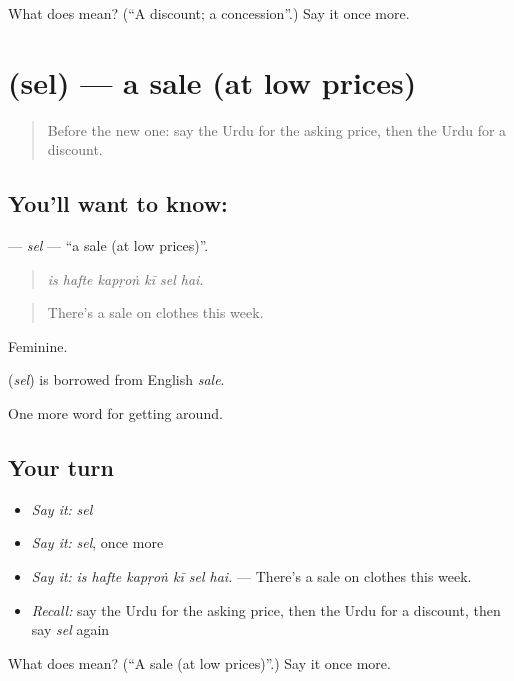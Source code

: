 \begin{tcolorbox}[breakable,colback=teal!4,colframe=teal!35!black,title={Before you move on}]
What does  mean? (\textquotedblleft{}A discount; a concession\textquotedblright{}.) Say it once more.
\end{tcolorbox}
\section[\texorpdfstring{\ur{سیل} (sel)}{سیل (sel)}]{ (sel) — a sale (at low prices)}

\label{lesson:UR-C423-sel}



\begin{quote}
Before the new one: say the Urdu for the asking price, then the Urdu for a discount.
\end{quote}

\subsection*{You'll want to know: }
\textbf{} — \emph{sel} — \textquotedblleft{}a sale (at low prices)\textquotedblright{}.

\begin{quote}
     
\end{quote}

\begin{quote}
\emph{is hafte kapṛoṅ kī sel hai.}
\end{quote}

\begin{quote}
There's a sale on clothes this week.
\end{quote}

Feminine.

\begin{cousinweb}
\textbf{} (\emph{sel}) is borrowed from English \emph{sale}.
\end{cousinweb}

\begin{grammarlens}[title={What you've built}]
One more word for getting around.
\end{grammarlens}

\subsection*{Your turn}
\begin{itemize}
\raggedright
  \item \emph{Say it:} \emph{sel}
  \item \emph{Say it:} \emph{sel}, once more
  \item \emph{Say it:} \emph{is hafte kapṛoṅ kī sel hai.} — There's a sale on clothes this week.
  \item \emph{Recall:} say the Urdu for the asking price, then the Urdu for a discount, then say \emph{sel} again
\end{itemize}

\begin{tcolorbox}[breakable,colback=teal!4,colframe=teal!35!black,title={Before you move on}]
What does  mean? (\textquotedblleft{}A sale (at low prices)\textquotedblright{}.) Say it once more.
\end{tcolorbox}
